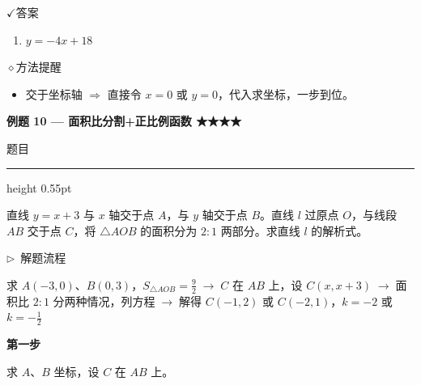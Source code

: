 \documentclass{exam-zh}
\newcommand{\edukai}{\kaishu}
\newcommand{\eduSectionTitle}[1]{%
  \needspace{5\baselineskip}%
  \vspace{2mm}
  {\color{edu-blue}\bfseries\large #1}\par
  \vspace{3mm}
}
\newenvironment{eduSubQuestionItem}[1]{%
  \needspace{4\baselineskip}%
  \vspace{2mm}
  \par\noindent
  \hangindent=8mm\hangafter=1
  {\color{edu-blue}\bfseries #1}\enspace
  \begingroup
  \color{edu-ink}
}{%
  \endgroup
  \par
  \vspace{3mm}
}
\newenvironment{eduAuxItem}[1]{%
  \needspace{4\baselineskip}%
  \vspace{2mm}
  \par\noindent
  \hangindent=8mm\hangafter=1
  {\color{edu-blue}\edukai $\triangleright$~#1}\enspace
  \begingroup
  \color{edu-ink}
  \edukai
}{%
  \endgroup
  \par
  \vspace{4mm}
}
\newcommand{\eduIconCheck}{\(\checkmark\)}
\newcommand{\eduIconPin}{\(\diamond\)}
\newenvironment{eduProblemBlock}[1][题目]{%
  \needspace{8\baselineskip}
  {\small\color{edu-muted}#1}\par
  \vspace{1.5mm}
  {\color{edu-blue}\hrule height 0.55pt}
  \vspace{4.5mm}
  \begingroup
  \color{edu-ink}
  \large
  \setlength{\parskip}{2.2mm}
  \linespread{1.20}\selectfont
}{%
  \par
  \endgroup
  \vspace{6mm}
}
\newenvironment{eduBulletList}{%
  \begin{itemize}[
    label=\textbullet,
    leftmargin=5mm,
    itemsep=1.2mm,
    topsep=0pt,
    parsep=0pt
  ]
}{%
  \end{itemize}
}
\newenvironment{eduBottomGrid}{%
  \vspace{1mm}
  \par\noindent
}{%
  \par\vspace{1mm}
}
\newenvironment{eduSummaryLeft}{%
  \begin{minipage}[t]{0.30\linewidth}
}{%
  \end{minipage}
}
\newcommand{\eduSummaryDivider}{%
  \hspace{4mm}{\color{edu-line}\vrule width 0.35pt}\hspace{7mm}%
}
\newenvironment{eduSummaryRight}{%
  \begin{minipage}[t]{0.58\linewidth}
}{%
  \end{minipage}
}
\newenvironment{eduPlainList}{%
  \begin{enumerate}[
    label=(\arabic*),
    leftmargin=7mm,
    itemsep=1.2mm,
    topsep=0pt,
    parsep=0pt
  ]
}{%
  \end{enumerate}
}
\begin{document}
\begin{eduBottomGrid}
  \begin{eduSummaryLeft}
    \begin{eduSummaryBlock}{\eduIconCheck}{答案}
    \begin{eduPlainList}
      \item $y = -4x + 18$    \end{eduPlainList}
    \end{eduSummaryBlock}
  \end{eduSummaryLeft}
  \eduSummaryDivider
  \begin{eduSummaryRight}
    \begin{eduSummaryBlock}{\eduIconPin}{方法提醒}
    \begin{eduBulletList}
      \item 交于坐标轴 $\Rightarrow$ 直接令 $x = 0$ 或 $y = 0$，代入求坐标，一步到位。    \end{eduBulletList}
    \end{eduSummaryBlock}
  \end{eduSummaryRight}
\end{eduBottomGrid}



\eduSectionTitle{例题 10 — 面积比分割+正比例函数 ★★★★}

\begin{eduProblemBlock}[题目]
直线 $y = x + 3$ 与 $x$ 轴交于点 $A$，与 $y$ 轴交于点 $B$。直线 $l$ 过原点 $O$，与线段 $AB$ 交于点 $C$，将 $\triangle AOB$ 的面积分为 $2:1$ 两部分。求直线 $l$ 的解析式。
\end{eduProblemBlock}





\begin{eduAuxItem}{解题流程}
求 $A(-3,0)$、$B(0,3)$，$S_{\triangle AOB} = \frac{9}{2}$$\;\to\;$$C$ 在 $AB$ 上，设 $C(x, x+3)$$\;\to\;$面积比 $2:1$ 分两种情况，列方程$\;\to\;$解得 $C(-1,2)$ 或 $C(-2,1)$，$k = -2$ 或 $k = -\frac{1}{2}$\end{eduAuxItem}




\begin{eduSubQuestionItem}{第一步}
求 $A$、$B$ 坐标，设 $C$ 在 $AB$ 上。\end{eduSubQuestionItem}
\end{document}
